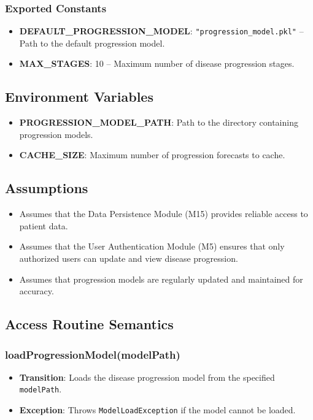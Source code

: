 \documentclass[12pt, titlepage]{article}
\begin{document}
\subsubsection{Exported Constants}
\begin{itemize}
    \item \textbf{DEFAULT\_PROGRESSION\_MODEL}: \texttt{"progression\_model.pkl"} -- Path to the default progression model.
    \item \textbf{MAX\_STAGES}: 10 -- Maximum number of disease progression stages.
\end{itemize}

\subsection{Environment Variables}
\begin{itemize}
    \item \textbf{PROGRESSION\_MODEL\_PATH}: Path to the directory containing progression models.
    \item \textbf{CACHE\_SIZE}: Maximum number of progression forecasts to cache.
\end{itemize}

\subsection{Assumptions}
\begin{itemize}
    \item Assumes that the Data Persistence Module (M15) provides reliable access to patient data.
    \item Assumes that the User Authentication Module (M5) ensures that only authorized users can update and view disease progression.
    \item Assumes that progression models are regularly updated and maintained for accuracy.
\end{itemize}

\subsection{Access Routine Semantics}

\subsubsection{loadProgressionModel(modelPath)}
\begin{itemize}
    \item \textbf{Transition}: Loads the disease progression model from the specified \texttt{modelPath}.
    \item \textbf{Exception}: Throws \texttt{ModelLoadException} if the model cannot be loaded.
\end{itemize}
\end{document}
